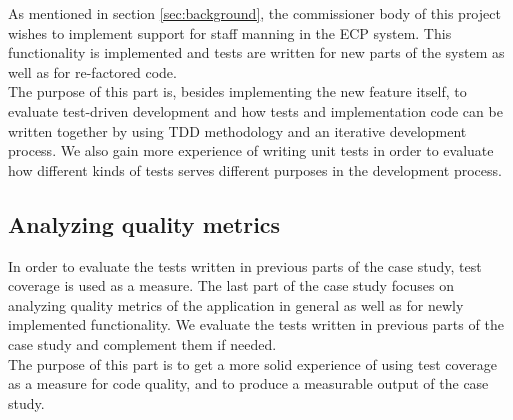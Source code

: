 As mentioned in section \ref{sec:background}, the commissioner body of
this project wishes to implement support for staff manning in the ECP
system. This functionality is implemented and tests are written for
new parts of the system as well as for re-factored code.\\

The purpose of this part is, besides implementing the new feature
itself, to evaluate test-driven development and how tests and
implementation code can be written together by using TDD methodology and
an iterative development process. We also gain more experience of
writing unit tests in order to evaluate how different kinds of tests
serves different purposes in the development process.\\


\subsection{Analyzing quality metrics}
\label{sec:casestudy_3}

In order to evaluate the tests written in previous parts of the case
study, test coverage is used as a measure. The last part of the case
study focuses on analyzing quality metrics of the application in general
as well as for newly implemented functionality. We evaluate the tests
written in previous parts of the case study and complement them if
needed.\\

The purpose of this part is to get a more solid experience of using test
coverage as a measure for code quality, and to produce a measurable
output of the case study.\\
